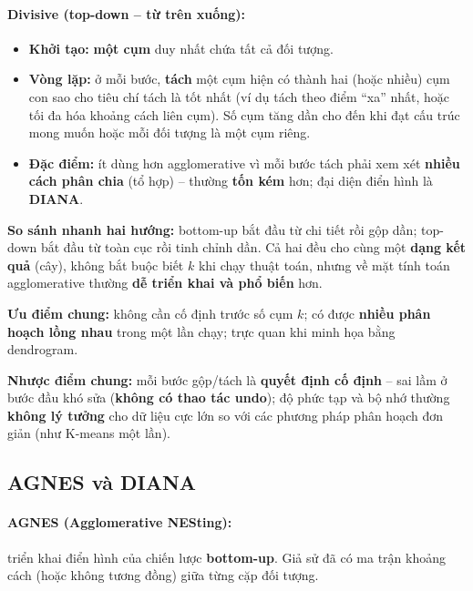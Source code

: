 \documentclass[10pt]{article}
\begin{document}
\paragraph{Divisive (top-down -- từ trên xuống):}
\begin{itemize}
    \item \textbf{Khởi tạo:} \textbf{một cụm} duy nhất chứa tất cả đối tượng.
    \item \textbf{Vòng lặp:} ở mỗi bước, \textbf{tách} một cụm hiện có thành hai (hoặc nhiều) cụm con sao cho tiêu chí tách là tốt nhất (ví dụ tách theo điểm ``xa'' nhất, hoặc tối đa hóa khoảng cách liên cụm). Số cụm tăng dần cho đến khi đạt cấu trúc mong muốn hoặc mỗi đối tượng là một cụm riêng.
    \item \textbf{Đặc điểm:} ít dùng hơn agglomerative vì mỗi bước tách phải xem xét \textbf{nhiều cách phân chia} (tổ hợp) -- thường \textbf{tốn kém} hơn; đại diện điển hình là \textbf{DIANA}.
\end{itemize}

\textbf{So sánh nhanh hai hướng:} bottom-up bắt đầu từ chi tiết rồi gộp dần; top-down bắt đầu từ toàn cục rồi tinh chỉnh dần. Cả hai đều cho cùng một \textbf{dạng kết quả} (cây), không bắt buộc biết $k$ khi chạy thuật toán, nhưng về mặt tính toán agglomerative thường \textbf{dễ triển khai và phổ biến} hơn.

\textbf{Ưu điểm chung:} không cần cố định trước số cụm $k$; có được \textbf{nhiều phân hoạch lồng nhau} trong một lần chạy; trực quan khi minh họa bằng dendrogram.

\textbf{Nhược điểm chung:} mỗi bước gộp/tách là \textbf{quyết định cố định} -- sai lầm ở bước đầu khó sửa (\textbf{không có thao tác undo}); độ phức tạp và bộ nhớ thường \textbf{không lý tưởng} cho dữ liệu cực lớn so với các phương pháp phân hoạch đơn giản (như K-means một lần).

\subsection{AGNES và DIANA}

\paragraph{AGNES (Agglomerative NESting):}
triển khai điển hình của chiến lược \textbf{bottom-up}. Giả sử đã có ma trận khoảng cách (hoặc không tương đồng) giữa từng cặp đối tượng.
\end{document}
